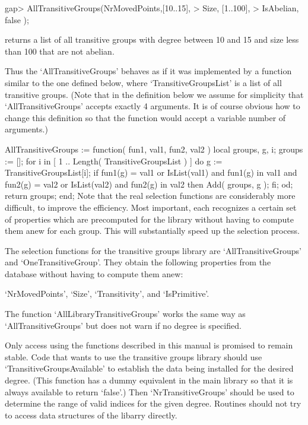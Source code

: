 \beginexample
gap> AllTransitiveGroups(NrMovedPoints,[10..15],
>                        Size,         [1..100],
>                        IsAbelian,    false    );
\endexample

returns a list of all transitive groups with degree between 10 and 15 and
size less than 100 that are not abelian.

Thus  the `AllTransitiveGroups'  behaves  as if   it was implemented  by a
function similar to the one defined below, where `TransitiveGroupsList' is a
list of all transitive groups.  (Note that in  the definition below we assume
for simplicity that `AllTransitiveGroups' accepts exactly 4 arguments.  It is
of course  obvious how to change this  definition so that the function would
accept a variable number of arguments.)

\begintt
AllTransitiveGroups := function( fun1, val1, fun2, val2 )
local    groups, g, i;
  groups := [];
  for i  in [ 1 .. Length( TransitiveGroupsList ) ] do
    g := TransitiveGroupsList[i];
    if      fun1(g) = val1  or IsList(val1) and fun1(g) in val1
        and fun2(g) = val2  or IsList(val2) and fun2(g) in val2
     then
      Add( groups, g );
    fi;
  od;
  return groups;
end;
\endtt
Note that the real  selection functions are considerably  more difficult,
to improve the efficiency. Most  important, each recognizes a certain set
of properties which are precomputed for the library without having to
compute them anew for each group. This will substantially speed up the
selection process.

The selection functions for the transitive
groups library are `AllTransitiveGroups' and `OneTransitiveGroup'. They
obtain the following properties from the database without having to compute
them anew:

`NrMovedPoints', `Size',   `Transitivity', and `IsPrimitive'.

The function `AllLibraryTransitiveGroups' works the same way as
`AllTransitiveGroups' but does not warn if no degree is specified.


Only access using the functions described in this manual is promised to
remain stable. Code that wants to use the transitive groups library should
use `TransitiveGroupsAvailable' to establish the data being installed for
the desired degree. (This function has a dummy equivalent in the main {\GAP}
library so that it is always available to return `false'.) Then
`NrTransitiveGroups' should be used to determine the range of valid indices for
the given degree. Routines should not try to access data structures of the
libarry directly.

